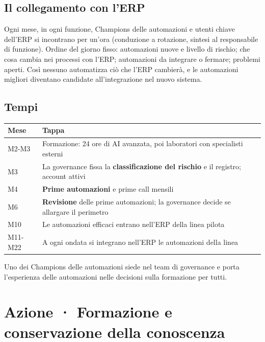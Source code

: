 \documentclass[11pt,a4paper]{article}
\begin{document}
\subsection{Il collegamento con l'ERP}\label{sec:11.3}
Ogni mese, in ogni funzione, Champions delle automazioni e utenti chiave dell'ERP si incontrano per un'ora (conduzione a rotazione, sintesi al responsabile di funzione). Ordine del giorno fisso: automazioni nuove e livello di rischio; che cosa cambia nei processi con l'ERP; automazioni da integrare o fermare; problemi aperti. Così nessuno automatizza ciò che l'ERP cambierà, e le automazioni migliori diventano candidate all'integrazione nel nuovo sistema.

\subsection{Tempi}\label{sec:11.4}

{\small\renewcommand{\arraystretch}{1.25}
\begin{xltabular}{\linewidth}{@{}>{\raggedright\arraybackslash{}\hsize\hspace{0pt}}X>{\raggedright\arraybackslash{}\hsize\hspace{0pt}}X@{}}
\toprule
\textbf{Mese} & \textbf{Tappa} \\
\midrule
\endhead
M2-M3 & Formazione: 24 ore di AI avanzata, poi laboratori con specialisti esterni \\
M3 & La governance fissa la \textbf{classificazione del rischio} e il registro; account attivi \\
M4 & \textbf{Prime automazioni} e prime call mensili \\
M6 & \textbf{Revisione} delle prime automazioni; la governance decide se allargare il perimetro \\
M10 & Le automazioni efficaci entrano nell'ERP della linea pilota \\
M11-M22 & A ogni ondata si integrano nell'ERP le automazioni della linea \\
\bottomrule
\end{xltabular}}

Uno dei Champions delle automazioni siede nel team di governance e porta l'esperienza delle automazioni nelle decisioni sulla formazione per tutti.

\section{Azione · Formazione e conservazione della conoscenza}\label{sec:12}
\end{document}
